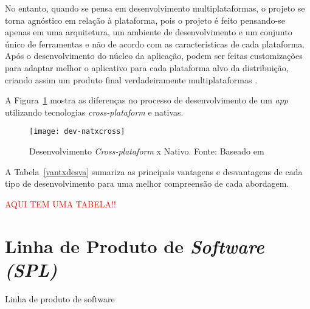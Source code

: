 No entanto, quando se pensa em desenvolvimento multiplataformas, o projeto se torna agnóstico em relação à plataforma, pois o projeto é feito pensando-se 
apenas em uma arquitetura, um ambiente de desenvolvimento e um conjunto único de ferramentas e não de acordo com as características de cada plataforma. Após o desenvolvimento do núcleo da
aplicação, podem ser feitas customizações para adaptar melhor o aplicativo para cada plataforma alvo da distribuição, criando assim um produto final verdadeiramente multiplataformas \cite{corral_ant_2012}.

A Figura~\ref{fig:dev-natxcross} mostra as diferenças no processo de desenvolvimento de um \textit{app} utilizando tecnologias \textit{cross-plataform} e 
nativas.

\begin{figure}[H]
  \centering
    \texttt{[image: dev-natxcross]}
    \caption[Desenvolvimento \textit{Cross-plataform} x Nativo]{ Desenvolvimento \textit{Cross-plataform} x Nativo. Fonte: Baseado em \cite{corral_ant_2012}}
	\label{fig:dev-natxcross}
\end{figure}

A Tabela~\ref{vantxdesva} sumariza as principais vantagens e desvantagens de cada tipo de desenvolvimento para uma melhor compreensão de cada abordagem.

\textcolor{red}{AQUI TEM UMA TABELA!!}



\chapter{Linha de Produto de \textit{Software (SPL)}} \label{cap:linhaproduto}

Linha de produto de software

